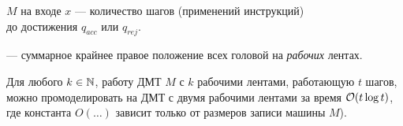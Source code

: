 \begin{defn}
	  $ M$ на входе $ x$ --- количество шагов (применений инструкций) \\ 
	до  достижения $ q_{acc}$ или $ q_{rej}$.

	\noindent
	  --- суммарное крайнее правое положение всех головой на \textit{рабочих} лентах.
\end{defn}

\begin{thm}\label{th:two_bands}
	Для любого $ k \in \mathbb{N}$, работу ДМТ  $ M$ с $ k$ рабочими лентами, работающую $ t$ шагов, можно  промоделировать на  ДМТ с двумя рабочими лентами за время  $ \mathcal{O}(t \log t)$,
	где константа $ O(\ldots ) $ зависит только от размеров записи машины $ M$).
\end{thm}
